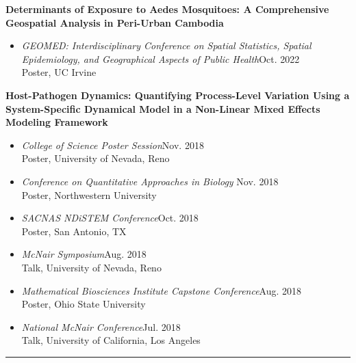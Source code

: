 \documentclass{article}
\begin{document}
\begin{description}
		\textbf{Determinants of Exposure to Aedes Mosquitoes: A Comprehensive Geospatial Analysis in Peri-Urban Cambodia}
		\begin{itemize}
			\item \textit{GEOMED: Interdisciplinary Conference on Spatial Statistics, Spatial Epidemiology, and Geographical Aspects of Public Health}\hfill{Oct. 2022}\\
			Poster, UC Irvine
		\end{itemize}
		
		\textbf{Host-Pathogen Dynamics: Quantifying Process-Level Variation Using a System-Specific Dynamical Model in a Non-Linear Mixed Effects Modeling Framework}
		\begin{itemize}
			\item \textit{College of Science Poster Session}\hfill{Nov. 2018}\\
			Poster, University of Nevada, Reno 
			
			\item \textit{Conference on Quantitative Approaches in Biology} \hfill{Nov. 2018}\\
			Poster, Northwestern University 
			
			\item \textit{SACNAS NDiSTEM Conference}\hfill{Oct. 2018}\\ 
			Poster, San Antonio, TX
			
			\item \textit{McNair Symposium}\hfill{Aug. 2018}\\
			Talk, University of Nevada, Reno 
			
			\item \textit{Mathematical Biosciences Institute Capstone Conference}\hfill{Aug. 2018}\\
			Poster, Ohio State University
			
			\item \textit{National McNair Conference}\hfill{Jul. 2018}\\
			Talk, University of California, Los Angeles
		\end{itemize}
		
	\end{description}
	\vspace{-2mm}
	\rule{\linewidth}{1pt}
	
	
\end{document}
